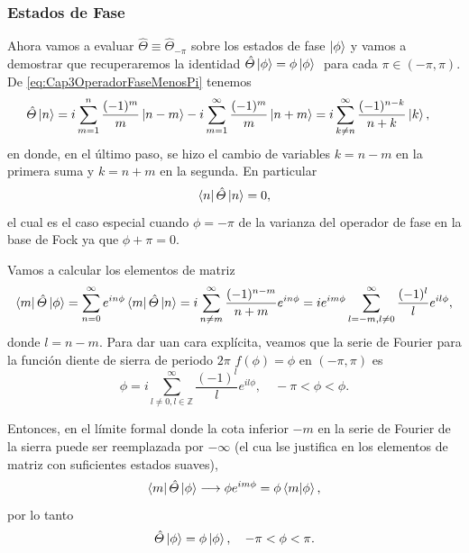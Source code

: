            \subsubsection{Estados de Fase}
                
                Ahora vamos a evaluar $\hat{\Theta} \equiv \hat{\Theta}_{-\pi}$ sobre los estados de fase $\ket{\phi}$ y vamos a demostrar que recuperaremos la identidad $\hat{\Theta}\ket{\phi} = \phi \ket{\phi}\; $ para cada $\pi \in \left(-\pi,\pi\right)$. De \ref{eq:Cap3OperadorFaseMenosPi} tenemos
                \begin{align*}
                    & \hat{\Theta}\ket{n} = i \sum_{m=1}^{n}\frac{(-1)^m}{m}\ket{n-m} - i \sum_{m=1}^{\infty} \frac{(-1)^m}{m}\ket{n+m} = i \sum_{k\neq n}^{\infty} \frac{(-1)^{n-k}}{n+k}\ket{k},
                \end{align*}
                en donde, en el último paso, se hizo el cambio de variables $k= n-m$ en la primera suma y $k= n+m$ en la segunda. En particular
                \begin{equation*}
                    \bra{n}\hat{\Theta}\ket{n} = 0,
                \end{equation*}
                el cual es el caso especial cuando $\phi = -\pi$ de la varianza del operador de fase en la base de Fock ya que $\phi + \pi = 0$.

                Vamos a calcular los elementos de matriz
                \begin{align*}
                    \bra{m}\hat{\Theta}\ket{\phi} = \sum_{n=0}^{\infty} e^{in\phi} \bra{m}\hat{\Theta}\ket{n} = i \sum_{n\neq m}^{\infty} \frac{(-1)^{n-m}}{n+m}e^{in\phi} = ie^{im\phi} \sum_{l=-m, l \neq 0}^{\infty} \frac{(-1)^l}{l}e^{il\phi},
                \end{align*}
                donde $l=n-m$.  Para dar uan cara explícita, veamos que la serie de Fourier para la función diente de sierra de periodo $2\pi$ $f(\phi) = \phi$ en $(-\pi,\pi)$ es
                \begin{equation*}
                    \phi = i \sum_{l\neq 0, l \in \mathbb{Z}}^{\infty} \frac{(-1)^l}{l}e^{il\phi}, \quad -\pi < \phi < \phi.
                \end{equation*}

                Entonces, en el límite formal donde la cota inferior $-m$ en  la serie de Fourier de la sierra puede ser reemplazada por $-\infty$ (el cua lse justifica en los elementos de matriz con suficientes estados suaves),
                \begin{equation}
                    \bra{m}\hat{\Theta}\ket{\phi} \longrightarrow \phi e^{im\phi} = \phi \braket{m|\phi},
                \end{equation}
                por lo tanto
                \begin{equation}
                    \hat{\Theta}\ket{\phi} = \phi \ket{\phi}, \quad -\pi < \phi < \pi.
                \end{equation}

